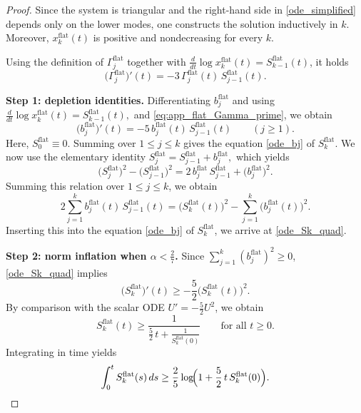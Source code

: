 \documentclass[reqno,11pt]{amsart}
\begin{document}
\begin{proof}
Since the system is triangular and the right-hand side in \eqref{ode_simplified}
depends only on the lower modes, one constructs the solution inductively in $k$.
Moreover, $x_k^{\mathrm{flat}}(t)$ is positive and nondecreasing for every $k$.


Using the definition of $\Gamma_j^{\mathrm{flat}}$ together with $\frac{d}{dt}\log x_k^{\mathrm{flat}}(t)=S_{k-1}^{\mathrm{flat}}(t)$, it holds
\begin{equation}
\label{eq:app_flat_Gamma_prime}
\bigl(\Gamma_j^{\mathrm{flat}}\bigr)'(t)
=
-3\,\Gamma_j^{\mathrm{flat}}(t)\,S_{j-1}^{\mathrm{flat}}(t).
\end{equation}

\medskip
\noindent\textbf{Step 1: depletion identities.}
Differentiating $b_j^{\mathrm{flat}}$ 
and using $\frac{d}{dt}\log x_k^{\mathrm{flat}}(t)=S_{k-1}^{\mathrm{flat}}(t),$ and \eqref{eq:app_flat_Gamma_prime}, we obtain
\begin{equation}
\label{eq:app_flat_b_prime}
\bigl(b_j^{\mathrm{flat}}\bigr)'(t)
=
-5\,b_j^{\mathrm{flat}}(t)\,S_{j-1}^{\mathrm{flat}}(t)
\qquad (j\ge1).
\end{equation}
Here, $S_0^{\mathrm{flat}}\equiv 0.$
Summing over $1\le j\le k$ gives the equation \eqref{ode_bj} of $S_k^{\mathrm{flat}}$.
We now use the elementary identity
$S_j^{\mathrm{flat}}=S_{j-1}^{\mathrm{flat}}+b_j^{\mathrm{flat}},$
which yields
\[
\bigl(S_j^{\mathrm{flat}}\bigr)^2-\bigl(S_{j-1}^{\mathrm{flat}}\bigr)^2
=
2\,b_j^{\mathrm{flat}}\,S_{j-1}^{\mathrm{flat}}
+\bigl(b_j^{\mathrm{flat}}\bigr)^2.
\]
Summing this relation over $1\le j\le k$, we obtain
\[
2\sum_{j=1}^k b_j^{\mathrm{flat}}(t)\,S_{j-1}^{\mathrm{flat}}(t)
=
\bigl(S_k^{\mathrm{flat}}(t)\bigr)^2-\sum_{j=1}^k \bigl(b_j^{\mathrm{flat}}(t)\bigr)^2.
\]
Inserting this into the equation \eqref{ode_bj} of $S_{k}^{\mathrm{flat}}$, we arrive at \eqref{ode_Sk_quad}.

\medskip
\noindent\textbf{Step 2: norm inflation when $\alpha<\frac27$.}
Since $\sum_{j=1}^k (b_j^{\mathrm{flat}})^2\ge0$, \eqref{ode_Sk_quad} implies
\[
\bigl(S_k^{\mathrm{flat}}\bigr)'(t)\ge -\frac52\bigl(S_k^{\mathrm{flat}}(t)\bigr)^2.
\]
By comparison with the scalar ODE $U'=-\frac52U^2$, we obtain
\begin{equation*}
S_k^{\mathrm{flat}}(t)
\ge
\frac{1}{\frac52\,t+\frac1{S_k^{\mathrm{flat}}(0)}}
\qquad\text{for all }t\ge0.
\end{equation*}
Integrating in time yields
\begin{equation}
\label{eq:app_flat_intS_lower}
\int_0^t S_k^{\mathrm{flat}}(s)\,ds
\ge
\frac25\log\!\Bigl(1+\frac52\,t\,S_k^{\mathrm{flat}}(0)\Bigr).
\end{equation}


\end{proof}
\end{document}
